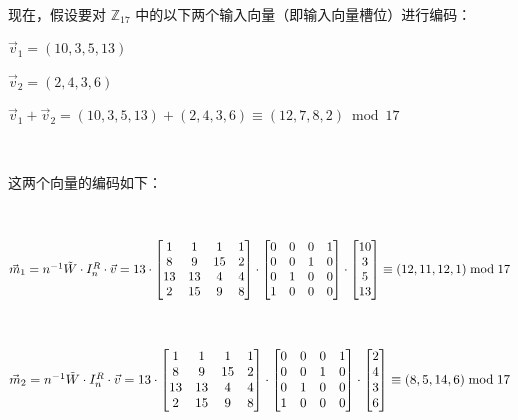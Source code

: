 $ $

现在，假设要对 $\mathbb{Z}_{17}$ 中的以下两个输入向量（即输入向量槽位）进行编码：

$\vec{v}_1 = (10, 3, 5, 13)$

$\vec{v}_2 = (2, 4, 3, 6)$

$\vec{v}_1 + \vec{v}_2 = (10, 3, 5, 13) + (2, 4, 3, 6) \equiv (12, 7, 8, 2) \bmod 17$

$ $

这两个向量的编码如下：

$ $

$\vec{m}_1 = n^{-1} \tilde{W} \cdot I_n^R \cdot \vec{v} = 13 \cdot \begin{bmatrix}
1 & 1 & 1 & 1\\
8 & 9 & 15 & 2\\
13 & 13 & 4 & 4\\
2 & 15 & 9 & 8\\
\end{bmatrix} \cdot \begin{bmatrix}
0 & 0 & 0 & 1\\
0 & 0 & 1 & 0\\
0 & 1 & 0 & 0\\
1 & 0 & 0 & 0\\
\end{bmatrix} \cdot \begin{bmatrix}
10\\
3\\
5\\
13\\
\end{bmatrix} \equiv (12, 11, 12, 1)  \bmod 17$

$ $

$\vec{m}_2 = n^{-1} \tilde{W} \cdot I_n^R \cdot \vec{v} = 13 \cdot \begin{bmatrix}
1 & 1 & 1 & 1\\
8 & 9 & 15 & 2\\
13 & 13 & 4 & 4\\
2 & 15 & 9 & 8\\
\end{bmatrix} \cdot \begin{bmatrix}
0 & 0 & 0 & 1\\
0 & 0 & 1 & 0\\
0 & 1 & 0 & 0\\
1 & 0 & 0 & 0\\
\end{bmatrix} \cdot \begin{bmatrix}
2\\
4\\
3\\
6\\
\end{bmatrix} \equiv (8, 5, 14, 6) \bmod 17$

